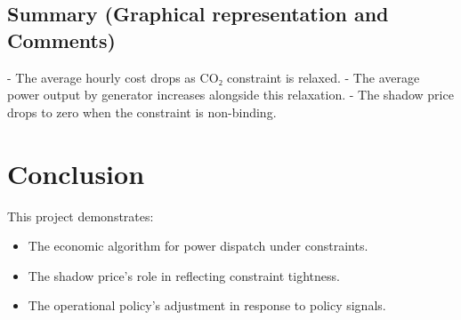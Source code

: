 \documentclass{report}
\begin{document}
\section{Summary (Graphical representation and Comments)}    

- The average hourly cost drops as CO₂ constraint is relaxed.  
- The average power output by generator increases alongside this relaxation.  
- The shadow price drops to zero when the constraint is non-binding.  

\chapter{Conclusion}

This project demonstrates:
\begin{itemize}
\item The economic algorithm for power dispatch under constraints.
\item The shadow price’s role in reflecting constraint tightness.
\item The operational policy’s adjustment in response to policy signals.
\end{itemize}
\end{document}
